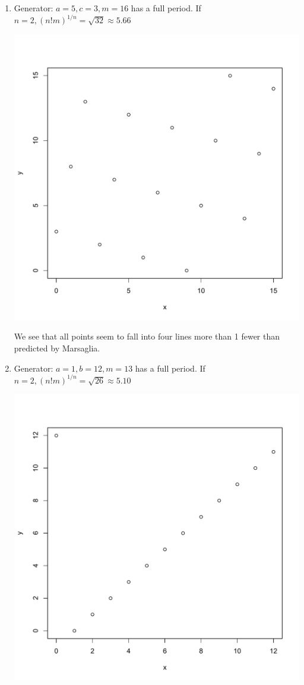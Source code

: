 \documentclass[11pt]{article} %
\begin{document}
\begin{enumerate}
\begin{enumerate}

\item Generator: $a = 5, c = 3, m = 16$ has a full period. If $n = 2, (n!m)^{1/n} = \sqrt{32} \approx 5.66$

\includegraphics[scale = .4]{plot1.pdf}

We see that all points seem to fall into four lines more than 1 fewer than predicted by Marsaglia.

\item Generator: $a = 1, b = 12, m = 13$ has a full period.  If $n = 2, (n!m)^{1/n} = \sqrt{26} \approx 5.10$

\includegraphics[scale = .4]{plot2.pdf}


\end{enumerate}
\end{enumerate}
\end{document}
